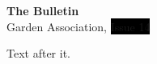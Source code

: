 \documentclass{article}
\begin{document}
\noindent\colorbox{masthead}{\parbox{\dimexpr\textwidth-2\fboxsep}{%
  \centering\color{white}\vspace{6pt}
  {\Huge\bfseries The Bulletin}\\[2pt]
  {\small Garden Association, \colorbox{black}{Issue 14}}
  \vspace{6pt}}}

Text after it.
\end{document}
